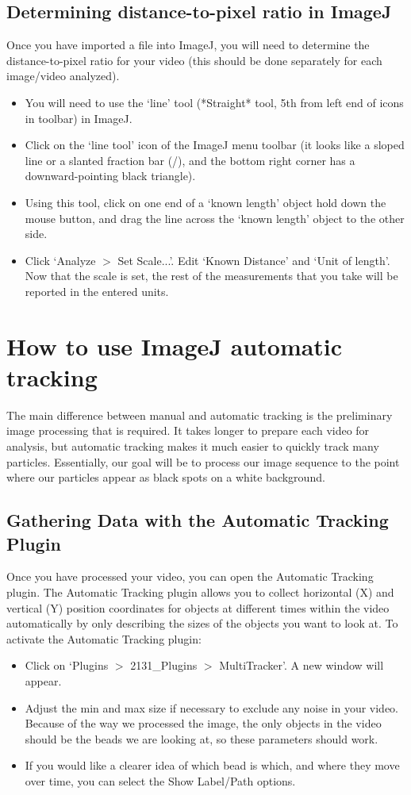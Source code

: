 \subsection*{Determining distance-to-pixel ratio in ImageJ}
Once you have imported a file into ImageJ, you will need to determine the distance-to-pixel ratio for your video (this should be done separately for each image/video analyzed). 
\begin{itemize}
\itemsep-0.3em
\item You will need to use the `line' tool (*Straight* tool, 5th from left end of icons in toolbar) in ImageJ.
\item Click on the `line tool' icon of the ImageJ menu toolbar (it looks like a sloped line or a slanted fraction bar (/), and the bottom right corner has a downward-pointing black triangle). 
\item Using this tool, click on one end of a `known length’ object hold down the mouse button, and drag the line across the `known length’ object to the other side. 
\item Click `Analyze $>$ Set Scale...'. Edit `Known Distance' and `Unit of length'. Now that the scale is set, the rest of the measurements that you take will be reported in the entered units.
\end{itemize}

\section{How to use ImageJ automatic tracking}
The main difference between manual and automatic tracking is the preliminary image processing that is required. 
It takes longer to prepare each video for analysis, but automatic tracking makes it much easier to quickly track many particles. 
Essentially, our goal will be to process our image sequence to the point where our particles appear as black spots on a white background.

\subsection*{Gathering Data with the Automatic Tracking Plugin}
Once you have processed your video, you can open the Automatic Tracking plugin. 
The Automatic Tracking plugin allows you to collect horizontal (X) and vertical (Y) position coordinates for objects at different times within the video automatically by only describing the sizes of the objects you want to look at. 
To activate the Automatic Tracking plugin:
\begin{itemize}
\itemsep-0.3em
\item Click on `Plugins $>$ 2131\_Plugins $>$ MultiTracker'. A new window will appear. 
\item Adjust the min and max size if necessary to exclude any noise in your video. 
Because of the way we processed the image, the only objects in the video should be the beads we are looking at, so these parameters should work.
\item If you would like a clearer idea of which bead is which, and where they move over time, you can select the Show Label/Path options.
\end{itemize}

